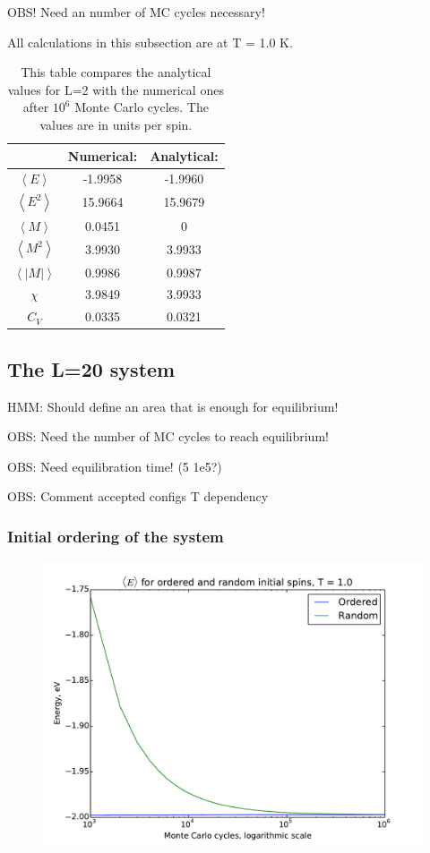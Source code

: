 OBS! Need an number of MC cycles necessary!

All calculations in this subsection are at T = 1.0 K. 

\begin{table}\caption{This table compares the analytical values for L=2 with the numerical ones after $10^6$ Monte Carlo cycles. The values are in units per spin.}\label{tab:compare_values}
	\begin{tabular}{ccc}
		& Numerical: & Analytical:\\ \hline
		$\left<E\right>$ &   -1.9958 & -1.9960\\
		$\left<E^2\right>$ &   15.9664 & 15.9679\\
		$\left<M\right>$ &    0.0451 & 0\\
		$\left<M^2\right>$ &    3.9930 & 3.9933\\
		$\left<|M|\right>$ &    0.9986 & 0.9987\\
		$\chi$ &   3.9849 & 3.9933\\
		$C_V$& 0.0335 & 0.0321\\
	\end{tabular}
\end{table}


\subsection{The L=20 system}

HMM: Should define an area that is enough for equilibrium!

OBS: Need the number of MC cycles to reach equilibrium!

OBS: Need equilibration time! (5 1e5?)

OBS: Comment accepted configs T dependency


\subsubsection{Initial ordering of the system}

\begin{figure}[H]
	\centering
	\includegraphics[width=0.7\linewidth]{../results/4c/ran_order_T1}
	\caption{}
	\label{fig:ranordert1}
\end{figure}

